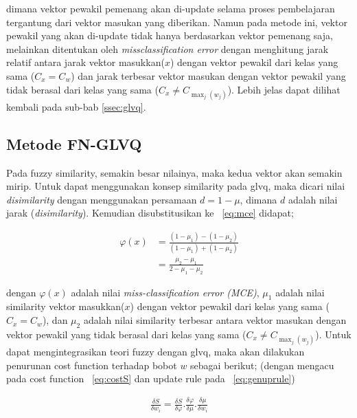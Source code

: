 dimana vektor pewakil pemenang akan di-update selama proses pembelajaran 
tergantung dari vektor masukan yang diberikan. Namun pada metode ini, vektor
pewakil yang akan di-update tidak hanya berdasarkan vektor pemenang saja,
melainkan ditentukan oleh \emph{missclassification error} dengan menghitung
jarak relatif antara jarak vektor masukkan($x$) dengan vektor pewakil dari
kelas yang sama ($C_x = C_w$) dan jarak terbesar vektor masukan dengan vektor
pewakil yang tidak berasal dari kelas yang sama ($C_x \neq C_{\max_{j}(w_j)}$).
Lebih jelas dapat dilihat kembali pada sub-bab \ref{ssec:glvq}.

\subsection{Metode FN-GLVQ}
Pada fuzzy similarity, semakin besar nilainya, maka kedua vektor akan semakin
mirip. Untuk dapat menggunakan konsep similarity pada \gls{glvq}, maka dicari
nilai \emph{disimilarity}  dengan menggunakan persamaan $d = 1 - \mu$, dimana
$d$ adalah nilai jarak (\emph{disimilarity}). Kemudian disubstitusikan ke
\equ~\ref{eq:mce} didapat;

\begin{align}
\label{eq:mcesim}
	\varphi(x) &= \frac{(1 - \mu_1) - (1 - \mu_2)}{(1 - \mu_1) + (1 -
	\mu_2)}\nonumber\\
	&= \frac{\mu_2 - \mu_1}{2 - \mu_1 - \mu_2}
\end{align}

dengan $\varphi(x)$ adalah nilai \emph{miss-classification error (MCE)},
$\mu_1$ adalah nilai similarity vektor masukkan($x$) dengan vektor pewakil dari
kelas yang sama ($C_x = C_w$), dan $\mu_2$ adalah nilai similarity
terbesar antara vektor masukan dengan vektor pewakil yang tidak berasal dari
kelas yang sama ($C_x \neq C_{\max_{j}(w_j)}$).  Untuk dapat mengintegrasikan
teori fuzzy dengan \gls{glvq}, maka akan dilakukan penurunan  cost function
terhadap bobot $w$ sebagai berikut; (dengan mengacu pada cost function
\equ~\ref{eq:costS} dan update rule pada \equ~\ref{eq:genuprule})

\begin{align}
\label{eq:turunancostS}
	\frac{\delta S}{\delta w_i} =  
	\frac{\delta S}{\delta \varphi} . \frac{\delta \varphi}{\delta \mu}.
	\frac{\delta \mu}{\delta w_i}
\end{align}


